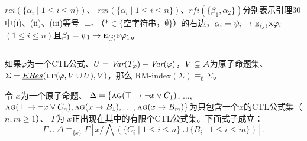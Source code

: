 \documentclass[aspectratio=1610, 9pt, CJK]{beamer}
\begin{document}
\begin{frame}
{{\begin{columns}
				{\tiny \textcolor{blue!80}{$rei(\{\alpha_i\mid 1\le i\le n\})$、
						$rxi(\{\alpha_i\mid 1\le i\le n\})$、$rfi(\{\beta_1,\alpha_2\})$分别表示引理30中(i)、(ii)、(iii)等号 $\equiv_*$（$* \in \{$空字符串，$\emptyset\}$）的右边，$\alpha_i=\psi_i\rightarrow \textsc{e}_{{\langle{j}\rangle}} \textsc{x} \varphi_i$ $(1\le i\le n)$且$\beta_1=\psi_1 \rightarrow \textsc{e}_{{\langle{j}\rangle}}\textsc{f} \varphi_1$。}
				}
			\end{columns}
			\begin{corollary}
				如果$\varphi$为一个CTL公式、$U=\textit{Var}(T_\varphi)-\textit{Var}(\varphi)$，$V\subseteq\cal A$为原子命题集、
				$\Sigma=\emph{ERes}(\textsc{uf}(\varphi,V\cup U),V)$，那么
				RM-index$(\Sigma)\equiv_\emptyset \Sigma$。
			\end{corollary}
			\begin{lemma}[一般化的Ackermann引理] \label{thm:Aclm}
				令 $x$为一个原子命题、 
				$\Delta = \{\textsc{a}\textsc{g}(\top \rightarrow \neg x \vee C_1)$, $\dots$, $\textsc{a}\textsc{g}(\top \rightarrow \neg x \vee C_n), \textsc{a}\textsc{g}(x \rightarrow B_1), \dots, \textsc{a}\textsc{g}(x \rightarrow B_m)\}$为只包含一个$x$的CTL公式集（$n, m \geq 1$）、
				$\Gamma$为 $x$正出现在其中的有限个CTL公式集。下面式子成立：
				\begin{equation}\label{eq:Ackermann:lemma}
					\Gamma\cup \Delta \equiv_{\{x\}}  
					\Gamma\left[x/\bigwedge\left(\{C_i\mid 1\le i\le n\}\cup\{B_i\mid 1\le i\le m\}\right)\right].
				\end{equation}
			\end{lemma}
		}
		
}
\end{frame}
\end{document}
